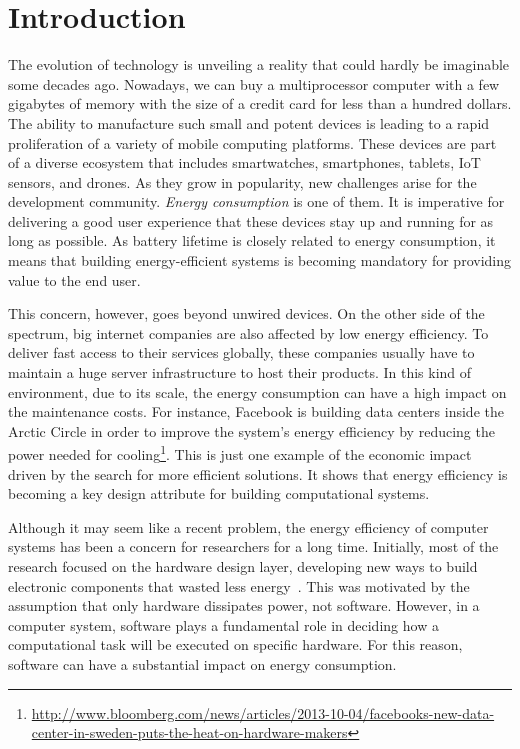 \chapter{Introduction}\label{chp:introduction}


The evolution of technology is unveiling a reality that could hardly be imaginable some decades ago. Nowadays, we can buy a multiprocessor computer with a few gigabytes of memory with the size of a credit card for less than a hundred dollars. The ability to manufacture such small and potent devices is leading to a rapid proliferation of a variety of mobile computing platforms. These devices are part of a diverse ecosystem that includes smartwatches, smartphones, tablets, IoT sensors, and drones. As they grow in popularity, new challenges arise for the development community. \emph{Energy consumption} is one of them. It is imperative for delivering a good user experience that these devices stay up and running for as long as possible. As battery lifetime is closely related to energy consumption, it means that building energy-efficient systems is becoming mandatory for providing value to the end user.

This concern, however, goes beyond unwired devices. On the other side of the spectrum, big internet companies are also affected by low energy efficiency. To deliver fast access to their services globally, these companies usually have to maintain a huge server infrastructure to host their products. In this kind of environment, due to its scale, the energy consumption can have a high impact on the maintenance costs. For instance, Facebook is building data centers inside the Arctic Circle in order to improve the system's energy efficiency by reducing the power needed for cooling\footnote{\scriptsize\url{http://www.bloomberg.com/news/articles/2013-10-04/facebooks-new-data-center-in-sweden-puts-the-heat-on-hardware-makers}}. This is just one example of the economic impact driven by the search for more efficient solutions. It shows that energy efficiency is becoming a key design attribute for building computational systems.

Although it may seem like a recent problem, the energy efficiency of computer systems has been a concern for researchers for a long time. Initially, most of the research focused on the hardware design layer, developing new ways to build electronic components that wasted less energy~\cite{chandrakasan:1992}. This was motivated by the assumption that only hardware dissipates power, not software. However, in a computer system, software plays a fundamental role in deciding how a computational task will be executed on specific hardware. For this reason, software can have a substantial impact on energy consumption.

